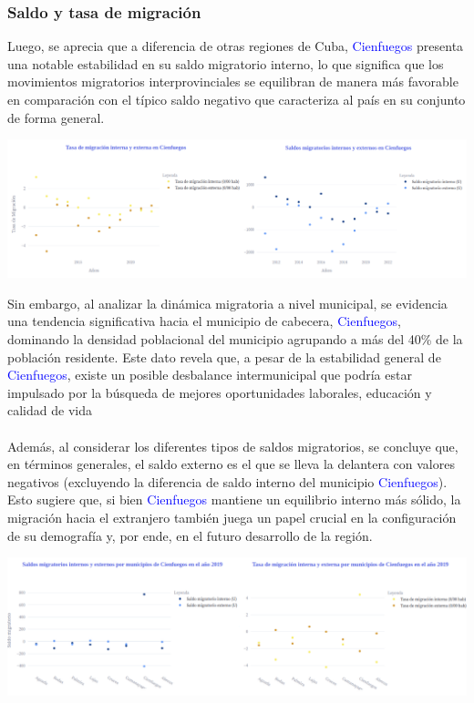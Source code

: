 \documentclass{article}
\begin{document}
\subsubsection{Saldo y tasa de migración}
Luego, se aprecia que a diferencia de otras regiones de Cuba, \textcolor{blue}{Cienfuegos} presenta una notable estabilidad en su saldo migratorio interno, lo que significa que los movimientos migratorios interprovinciales se equilibran de manera más favorable en comparación con el típico saldo negativo que caracteriza al país en su conjunto de forma general.
\begin{center}
    \includegraphics[width=1.0\textwidth]{img/fig4.png}
\end{center}
Sin embargo, al analizar la dinámica migratoria a nivel municipal, se evidencia una tendencia significativa hacia el municipio de cabecera, \textcolor{blue}{Cienfuegos}, dominando la densidad poblacional del municipio agrupando a más del 40\% de la población residente. Este dato revela que, a pesar de la estabilidad general de \textcolor{blue}{Cienfuegos}, existe un posible desbalance intermunicipal que podría estar impulsado por la búsqueda de mejores oportunidades laborales, educación y calidad de vida\\\\
Además, al considerar los diferentes tipos de saldos migratorios, se concluye que, en términos generales, el saldo externo es el que se lleva la delantera con valores negativos (excluyendo la diferencia de saldo interno del municipio \textcolor{blue}{Cienfuegos}). Esto sugiere que, si bien \textcolor{blue}{Cienfuegos} mantiene un equilibrio interno más sólido, la migración hacia el extranjero también juega un papel crucial en la configuración de su demografía y, por ende, en el futuro desarrollo de la región.
\begin{center}
    \includegraphics[width=1.0\textwidth]{img/fig5.png}
\end{center}
\end{document}
